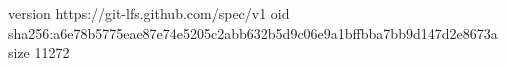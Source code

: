 version https://git-lfs.github.com/spec/v1
oid sha256:a6e78b5775eae87e74e5205c2abb632b5d9c06e9a1bffbba7bb9d147d2e8673a
size 11272
